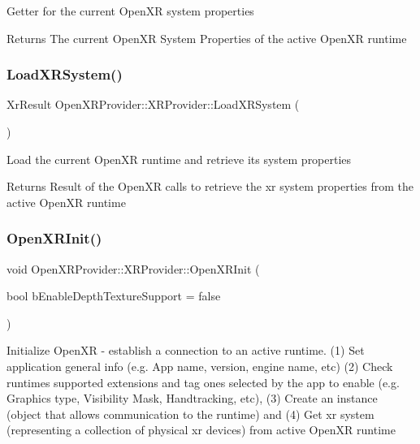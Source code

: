 Getter for the current Open\+XR system properties \begin{DoxyReturn}{Returns}
The current Open\+XR System Properties of the active Open\+XR runtime 
\end{DoxyReturn}
\mbox{\label{class_open_x_r_provider_1_1_x_r_provider_a1bd2735b39ea943cd9e436bb0650bc43}} 
\subsubsection{\texorpdfstring{LoadXRSystem()}{LoadXRSystem()}}
{\footnotesize\ttfamily Xr\+Result Open\+X\+R\+Provider\+::\+X\+R\+Provider\+::\+Load\+X\+R\+System (\begin{DoxyParamCaption}{ }\end{DoxyParamCaption})\hspace{0.3cm}{\ttfamily [private]}}

Load the current Open\+XR runtime and retrieve its system properties \begin{DoxyReturn}{Returns}
Result of the Open\+XR calls to retrieve the xr system properties from the active Open\+XR runtime 
\end{DoxyReturn}
\mbox{\label{class_open_x_r_provider_1_1_x_r_provider_a0d19487d4508a89e3554a9fa328b4a05}} 
\subsubsection{\texorpdfstring{OpenXRInit()}{OpenXRInit()}}
{\footnotesize\ttfamily void Open\+X\+R\+Provider\+::\+X\+R\+Provider\+::\+Open\+X\+R\+Init (\begin{DoxyParamCaption}\item[{bool}]{b\+Enable\+Depth\+Texture\+Support = {\ttfamily false} }\end{DoxyParamCaption})\hspace{0.3cm}{\ttfamily [private]}}

Initialize Open\+XR -\/ establish a connection to an active runtime. (1) Set application general info (e.\+g. App name, version, engine name, etc) (2) Check runtime\textquotesingle{}s supported extensions and tag ones selected by the app to enable (e.\+g. Graphics type, Visibility Mask, Handtracking, etc), (3) Create an instance (object that allows communication to the runtime) and (4) Get xr system (representing a collection of physical xr devices) from active Open\+XR runtime \mbox{\label{class_open_x_r_provider_1_1_x_r_provider_a1eb2fce148d5ab2d3399235c23131808}} 
